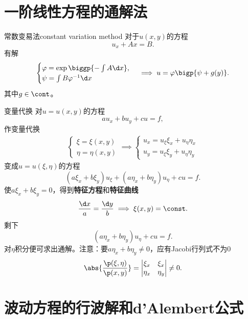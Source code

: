 \section{一阶线性方程的通解法}
\begin{method}{常数变易法}{constant variation method}
	对于$u(x,y)$的方程
	\[
		u_x+Ax=B.
	\]
	有解
	\begin{align*}
		\begin{cases}
			\varphi=\exp\biggp{-\int A\d x},  \\
			\psi=\int B\varphi^{-1}\d x
		\end{cases}
		\implies u=\varphi\bigp{\psi+g(y)}.
	\end{align*}
	其中$g\in\cont$。
\end{method}
\begin{method}{变量代换}
	对$u=u(x,y)$的方程
	\[
		au_x+bu_y+cu=f,
	\]
	作变量代换
	\begin{align*}
		\begin{cases}
			\xi=\xi(x,y)  \\
			\eta=\eta(x,y)
		\end{cases}
		\implies
		\begin{cases}
			u_x=u_\xi\xi_x+u_\eta\eta_x \\
			u_y=u_\xi\xi_y+u_\eta\eta_y
		\end{cases}
	\end{align*}
	变成$u=u(\xi,\eta)$的方程
	\[
		(a\xi_x+b\xi_y)u_\xi+(a\eta_x+b\eta_y)u_\eta+cu=f.
	\]
	使$a\xi_x+b\xi_y=0$，得到\textbf{特征方程}和\textbf{特征曲线}
	\begin{align}
		\frac{\d x}a=\frac{\d y}b\implies\xi(x,y)=\const.
	\end{align}
	剩下
	\[
		(a\eta_x+b\eta_y)u_\eta+cu=f.
	\]
	对$\eta$积分便可求出通解。注意：要$a\eta_x+b\eta_y\neq 0$，应有Jacobi行列式不为0
	\begin{align*}
		\abs{\frac{\p(\xi,\eta)}{\p(x,y)}}=
		\begin{vmatrix}
			\xi_x  & \xi_x  \\
			\eta_x & \eta_y
		\end{vmatrix}\neq 0.
	\end{align*}
\end{method}

\section{波动方程的行波解和d'Alembert公式}

